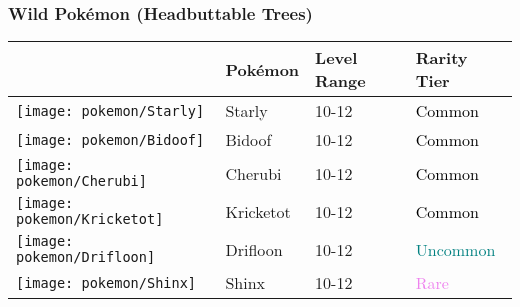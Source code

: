 \subsubsection{Wild Pokémon (Headbuttable Trees)}%
\label{ssubsec:WildPokmon(HeadbuttableTrees)}%
\begin{longtable}{||l l l l||}%
\hline%
&Pokémon&Level Range&Rarity Tier\\%
\hline%
\endhead%
\hline%
\texttt{[image: pokemon/Starly]}&Starly&10{-}12&\textcolor{black}{%
Common%
}\\%
\hline%
\texttt{[image: pokemon/Bidoof]}&Bidoof&10{-}12&\textcolor{black}{%
Common%
}\\%
\hline%
\texttt{[image: pokemon/Cherubi]}&Cherubi&10{-}12&\textcolor{black}{%
Common%
}\\%
\hline%
\texttt{[image: pokemon/Kricketot]}&Kricketot&10{-}12&\textcolor{black}{%
Common%
}\\%
\hline%
\texttt{[image: pokemon/Drifloon]}&Drifloon&10{-}12&\textcolor{teal}{%
Uncommon%
}\\%
\hline%
\texttt{[image: pokemon/Shinx]}&Shinx&10{-}12&\textcolor{violet}{%
Rare%
}\\%
\hline%
\end{longtable}%
\caption{Wild Pokemon in Fuego Ironworks (Headbuttable Trees)}